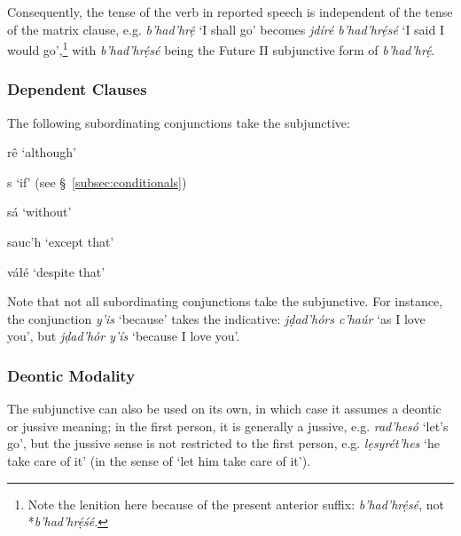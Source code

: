 \documentclass[a4paper, 12pt, twoside, final]{article}
\newlength{\EnumItemSep} \EnumItemSep-3pt
\newenvironment { dlist } [1] [{}] {
    \vspace { -.5em }
    \begingroup
    \def\descriptionlabel ##1 {\hspace\labelsep \normalfont #1 ##1}
    \settowidth \leftmargini { 99.\hskip\labelsep }
    \begin { description }
    \itemsep \EnumItemSep
} {
    \end { description }
    \endgroup
    \vspace { -.5em }
}
\let \w \textit
\begin{document}
Consequently, the tense of the verb in reported speech is independent of the tense of the matrix clause, e.g.
\w{b’had’hrệ} ‘I shall go’ becomes \w{jdíré b’had’hrẹ́sé} ‘I said I would go’,\footnote{Note the lenition here because
of the present anterior suffix: \w{b’had’hrẹ́sé}, not *\w{b’had’hrẹ́śé}.} with \w{b’had’hrẹ́sé} being the Future II
subjunctive form of \w{b’had’hrẹ́}.

\subsubsection{Dependent Clauses}
The following subordinating conjunctions take the subjunctive:
 {
\begin{dlist}[\bfseries\itshape]
    \item[rê] ‘although’
    \item[s] ‘if’ (see §~\ref{subsec:conditionals})
    \item[sá] ‘without’
    \item[sauc’h] ‘except that’
    \item[váłé] ‘despite that’
\end{dlist}
}

\noindent Note that not all subordinating conjunctions take the subjunctive. For instance, the conjunction \w{y’is}
‘because’ takes the indicative: \w{jḍad’hórs c’haúr} ‘as I love you’, but \w{jḍad’hór y’ís} ‘because I love you’.

\subsubsection{Deontic Modality}
The subjunctive can also be used on its own, in which case it assumes a deontic or jussive meaning;
in the first person, it is generally a jussive, e.g. \w{rad’hesó} ‘let’s go’, but the jussive sense is not restricted
to the first person, e.g. \w{lẹsyrét’hes} ‘he take care of it’ (in the sense of ‘let him take care of it’).
\end{document}
